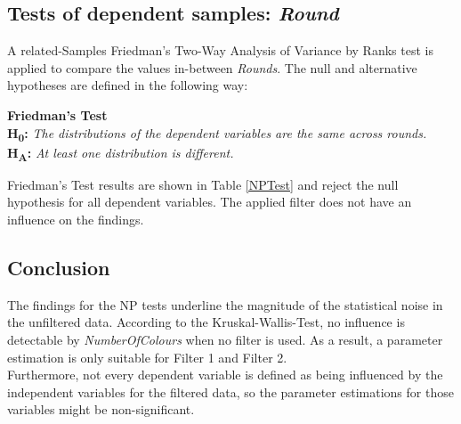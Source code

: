 
\subsection{Tests of dependent samples: \textit{Round}}
A related-Samples Friedman's Two-Way Analysis of Variance by Ranks test \citep{Friedman1937} is applied to compare the values in-between \textit{Rounds}. The null and alternative hypotheses are defined in the following way:

\textbf{Friedman's Test} \\ 
\textbf{H\textsubscript{0}:} \textit{The distributions of the dependent variables are the same across rounds.}\\
\textbf{H\textsubscript{A}:} \textit{At least one distribution is different.}

Friedman's Test results are shown in Table \ref{NPTest} and reject the null hypothesis for all dependent variables. The applied filter does not have an influence on the findings.

\subsection{Conclusion}
The findings for the \ac{NP} tests underline the magnitude of the statistical noise in the unfiltered data. According to the Kruskal-Wallis-Test, no influence is detectable by \textit{NumberOfColours} when no filter is used. As a result, a parameter estimation is only suitable for Filter 1 and Filter 2.\\
Furthermore, not every dependent variable is defined as being influenced by the independent variables for the filtered data, so the parameter estimations for those variables might be non-significant.
\newpage
